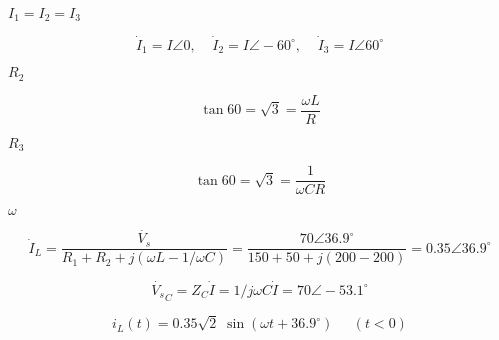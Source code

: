 {\newpage\clearpage
{}%
$I_1=I_2=I_3$%
\lthtmlinlinemathZ
\lthtmlcheckvsize\clearpage}

{\newpage\clearpage
{}%
\begin{displaymath} \dot{I}_1=I\angle 0,\;\;\;\;\dot{I}_2=I\angle -60^\circ,\;\;\;\;\dot{I}_3=I\angle 60^\circ \end{displaymath}%
\lthtmldisplayZ
\lthtmlcheckvsize\clearpage}

{\newpage\clearpage
{}%
$R_2$%
\lthtmlinlinemathZ
\lthtmlcheckvsize\clearpage}

{\newpage\clearpage
{}%
\begin{displaymath} \tan 60=\sqrt{3}= \frac{\omega L}{R} \end{displaymath}%
\lthtmldisplayZ
\lthtmlcheckvsize\clearpage}

{\newpage\clearpage
{}%
$R_3$%
\lthtmlinlinemathZ
\lthtmlcheckvsize\clearpage}

{\newpage\clearpage
{}%
\begin{displaymath} \tan 60=\sqrt{3}= \frac{1}{\omega CR} \end{displaymath}%
\lthtmldisplayZ
\lthtmlcheckvsize\clearpage}

{\newpage\clearpage
{}%
$\omega$%
\lthtmlinlinemathZ
\lthtmlcheckvsize\clearpage}

{\newpage\clearpage
{}%
\begin{displaymath} \dot{I}_L=\frac{\dot{V_s}}{R_1+R_2+j(\omega L-1/\omega C)}
=\frac{70\angle 36.9^\circ}{150+50+j(200-200)}=0.35\angle 36.9^\circ \end{displaymath}%
\lthtmldisplayZ
\lthtmlcheckvsize\clearpage}

{\newpage\clearpage
{}%
\begin{displaymath} \dot{V_s}_C=Z_C \dot{I}=1/j\omega C \dot{I}=70\angle -53.1^\circ \end{displaymath}%
\lthtmldisplayZ
\lthtmlcheckvsize\clearpage}

{\newpage\clearpage
{}%
\begin{displaymath} i_L(t)=0.35\sqrt{2}\;\sin(\omega t+36.9^\circ)\;\;\;\;\;(t<0) \end{displaymath}%
\lthtmldisplayZ
\lthtmlcheckvsize\clearpage}

